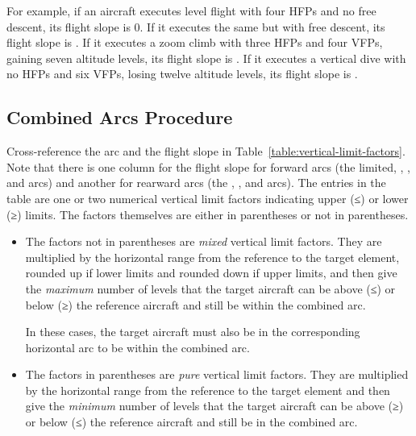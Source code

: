 \begin{advancedrules}
{        For example, if an aircraft executes level flight with four HFPs and no free descent, its flight slope is 0. If it executes the same but with free descent, its flight slope is . If it executes a zoom climb with three HFPs and four VFPs, gaining seven altitude levels, its flight slope is . If it executes a vertical dive with no HFPs and six VFPs, losing twelve altitude levels, its flight slope is .

        \subsection{Combined Arcs Procedure}

        

        Cross-reference the arc and the flight slope in Table~\ref{table:vertical-limit-factors}. Note that there is one column for the flight slope for forward arcs (the limited, , , and  arcs) and another for rearward arcs (the ,  , and   arcs). The entries in the table are one or two numerical vertical limit factors indicating upper (≤) or lower (≥) limits. The factors themselves are either in parentheses or not in parentheses.

        \begin{itemize}

            \item
                The factors not in parentheses are \emph{mixed} vertical limit factors. They are multiplied by the horizontal range from the reference to the target element, rounded up if lower limits and rounded down if upper limits, and then give the \emph{maximum} number of levels that the target aircraft can be above (≤) or below (≥) the reference aircraft and still be within the combined arc.

                In these cases, the target aircraft must also be in the corresponding horizontal arc to be within the combined arc.

            \item
                The factors in parentheses are \emph{pure} vertical limit factors. They are multiplied by the horizontal range from the reference to the target element and then give the \emph{minimum} number of levels that the target aircraft can be above (≥) or below (≤) the reference aircraft and still be in the combined arc.


\end{itemize}}
\end{advancedrules}
